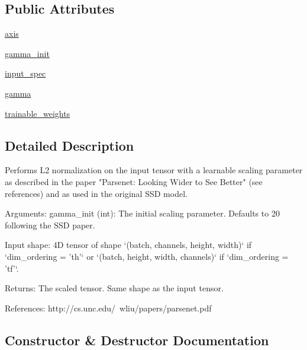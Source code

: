 \subsection*{Public Attributes}
\begin{DoxyCompactItemize}
\item 
\hyperlink{classkeras__utils_1_1keras__layer___l2_normalization_1_1_l2_normalization_a14c9cb005b543eac21ce2ba17c1eb49e}{axis}
\item 
\hyperlink{classkeras__utils_1_1keras__layer___l2_normalization_1_1_l2_normalization_a692198f0ef32ded740d28f5e89684a0e}{gamma\+\_\+init}
\item 
\hyperlink{classkeras__utils_1_1keras__layer___l2_normalization_1_1_l2_normalization_a1abbe639712dc72d6db7ff2074044ba4}{input\+\_\+spec}
\item 
\hyperlink{classkeras__utils_1_1keras__layer___l2_normalization_1_1_l2_normalization_ab7b23065ad64ef9d19c8d869c914b417}{gamma}
\item 
\hyperlink{classkeras__utils_1_1keras__layer___l2_normalization_1_1_l2_normalization_a5cb4f097f087e58e797e8132c68b8d9d}{trainable\+\_\+weights}
\end{DoxyCompactItemize}


\subsection{Detailed Description}
\begin{DoxyVerb}Performs L2 normalization on the input tensor with a learnable scaling parameter
as described in the paper "Parsenet: Looking Wider to See Better" (see references)
and as used in the original SSD model.

Arguments:
    gamma_init (int): The initial scaling parameter. Defaults to 20 following the
        SSD paper.

Input shape:
    4D tensor of shape `(batch, channels, height, width)` if `dim_ordering = 'th'`
    or `(batch, height, width, channels)` if `dim_ordering = 'tf'`.

Returns:
    The scaled tensor. Same shape as the input tensor.

References:
    http://cs.unc.edu/~wliu/papers/parsenet.pdf
\end{DoxyVerb}
 

\subsection{Constructor \& Destructor Documentation}
\mbox{\label{classkeras__utils_1_1keras__layer___l2_normalization_1_1_l2_normalization_a44d3d7b777a42cb28b5bbbcead7b2725}} 
